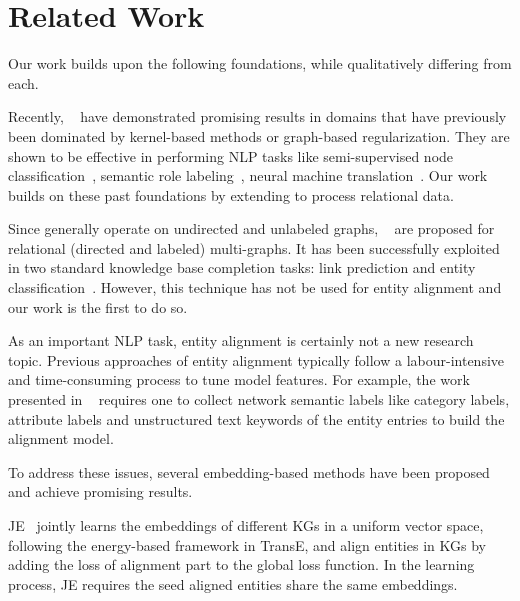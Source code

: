 
	
	\section{Related Work}
    Our work builds upon the following foundations, while qualitatively differing from each.


	 Recently, \GCNs~\cite{Duvenaud2015Convolutional,Kearnes2016Molecular}
    have demonstrated promising results in domains that have previously been dominated by kernel-based methods or graph-based regularization.
    They are shown to be effective in performing NLP tasks like semi-supervised
    node classification~\cite{Kipf2016Semi}, semantic role labeling~\cite{Marcheggiani2017Encoding}, neural machine
    translation~\cite{Bastings2017Graph}. Our work builds on these past foundations by extending \GCNs to process relational data.


	Since \GCNs generally operate on undirected and unlabeled graphs, \RGCNs~\cite{Schlichtkrull2017Modeling} are proposed  for relational
(directed and labeled) multi-graphs. It has been successfully exploited in two standard knowledge base completion tasks: link prediction
and entity classification~\cite{Schlichtkrull2017Modeling}. However, this technique has not be used for entity alignment and our work is
the first to do so.


	
	 As an important NLP task, entity alignment is certainly not a new research topic. Previous approaches of
entity alignment typically follow a labour-intensive and time-consuming process to tune model features. For example, the work presented in
~\cite{Wang2017} requires one to collect network semantic labels like category labels, attribute labels and unstructured
text keywords of the entity entries to build the alignment model.

	
	
	To address these issues, several embedding-based methods have been proposed and achieve promising results.
	
	JE~\cite{hao2016joint} jointly learns the embeddings of different KGs in a uniform vector space, following the energy-based framework in TransE, and align entities in KGs by adding the loss of alignment part to the global loss function. In the learning process, JE requires the seed aligned entities share the same embeddings.
	
